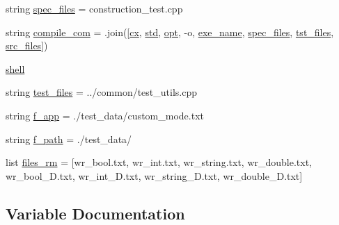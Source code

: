 \begin{DoxyCompactItemize}
\item 
string \hyperlink{namespacecompilation_a7870c1a877bc1c9cb395aa9fb1c25982}{spec\+\_\+files} = \textquotesingle{}construction\+\_\+test.\+cpp \textquotesingle{}
\item 
string \hyperlink{namespacecompilation_acc06f7d6e6ac81f21bc105c13d08a576}{compile\+\_\+com} = \textquotesingle{} \textquotesingle{}.join(\mbox{[}\hyperlink{namespacecompilation_ad0f846bbbc95dcce53b9f00d8c807571}{cx}, \hyperlink{namespacecompilation_a762bca1fba31c18bcb62094e66cd2aa2}{std}, \hyperlink{namespacecompilation_a57efc23010b24292a9208b55ff35c3e8}{opt}, \textquotesingle{}-\/o\textquotesingle{}, \hyperlink{namespacecompilation_afbfcd1e8d9e1c7a3d1bed4a27abe8b72}{exe\+\_\+name}, \hyperlink{namespacecompilation_a7870c1a877bc1c9cb395aa9fb1c25982}{spec\+\_\+files}, \hyperlink{namespacecompilation_afc391618d31035167addaa7c490b4b83}{tst\+\_\+files}, \hyperlink{namespacecompilation_a10d70893afdbc9620e6bd6d4b65b263c}{src\+\_\+files}\mbox{]})
\item 
\hyperlink{namespacecompilation_af931e0fad7111cfe4093d1e7910c9047}{shell}
\item 
string \hyperlink{namespacecompilation_af5b96eb6fff973f2670825ebd43d0f99}{test\+\_\+files} = \textquotesingle{}../common/test\+\_\+utils.\+cpp\textquotesingle{}
\item 
string \hyperlink{namespacecompilation_aa526330f451b511fd70aac0c57cb3b73}{f\+\_\+app} = \textquotesingle{}./test\+\_\+data/custom\+\_\+mode.\+txt\textquotesingle{}
\item 
string \hyperlink{namespacecompilation_adacd7e1df33e91957d93e318c212565a}{f\+\_\+path} = \textquotesingle{}./test\+\_\+data/\textquotesingle{}
\item 
list \hyperlink{namespacecompilation_a73c7f1a5fdfc4f66cba04fc73114a988}{files\+\_\+rm} = \mbox{[}\textquotesingle{}wr\+\_\+bool.\+txt\textquotesingle{}, \textquotesingle{}wr\+\_\+int.\+txt\textquotesingle{}, \textquotesingle{}wr\+\_\+string.\+txt\textquotesingle{}, \textquotesingle{}wr\+\_\+double.\+txt\textquotesingle{}, \textquotesingle{}wr\+\_\+bool\+\_\+D.\+txt\textquotesingle{}, \textquotesingle{}wr\+\_\+int\+\_\+D.\+txt\textquotesingle{}, \textquotesingle{}wr\+\_\+string\+\_\+D.\+txt\textquotesingle{}, \textquotesingle{}wr\+\_\+double\+\_\+D.\+txt\textquotesingle{}\mbox{]}
\end{DoxyCompactItemize}


\subsection{Variable Documentation}
\mbox{\label{namespacecompilation_acc06f7d6e6ac81f21bc105c13d08a576}} 
